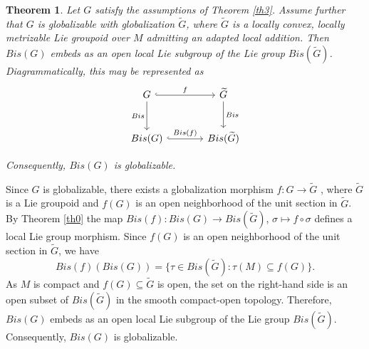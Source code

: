 \documentclass[12pt,a4paper]{amsart}
\makeatletter
\theoremstyle{plain}
\newtheorem{theorem}{Theorem}[section]
\theoremstyle{definition}
\renewenvironment{proof}[1][\proofname]{%
  \par\vspace{0.1em} %
  \pushQED{\qed}%
  \normalfont \topsep0pt \trivlist
  \item[\hskip\labelsep\itshape #1\@addpunct{.}]\ignorespaces
}{%
  \popQED\endtrivlist\@endpefalse
}
\makeatother
\begin{document}
\begin{theorem}
Let $G$ satisfy the assumptions of Theorem \ref{th3}. Assume further that $G$ is globalizable with globalization $\widetilde{G}$, where $\widetilde{G}$ is a locally convex, locally metrizable Lie groupoid over $M$ admitting an adapted local addition.
Then $Bis(G)$  embeds as an open local Lie subgroup of the Lie group $Bis(\widetilde{G})$. Diagrammatically, this  may be represented as
$$\begin{tikzcd}[column sep=large,row sep=large]
G \arrow[r, hook, "f"] \arrow[d, "Bis"']
& \widetilde{G} \arrow[d, "Bis"] \\
Bis(G) \arrow[r, hook, "Bis(f)"]
& Bis(\widetilde{G})
\end{tikzcd}$$ 

Consequently, $Bis(G)$  is globalizable.
\end{theorem}


\begin{proof}
    Since $G$ is globalizable, there exists a globalization morphism
$f:G\to \widetilde{G}$ ,
where $\widetilde{G}$  is a Lie groupoid and $f(G)$  is an open neighborhood of the unit section in $\widetilde{G}$. By Theorem \ref{th0} the map $Bis(f):Bis(G) \rightarrow Bis(\widetilde{G})$, $\sigma \mapsto  f \circ \sigma$ defines a local Lie group morphism. 
Since $f(G)$  is an open neighborhood of the unit section in $ \widetilde{G}$, we have
$$Bis(f)(Bis(G))=\{\tau\in Bis(\widetilde{G}) : \tau(M)\subseteq f(G)\}.$$
As $M$ is compact and $f(G)\subseteq \widetilde{G}$  is open, the set on the right-hand side is an open subset of $Bis(\widetilde{G})$  in the smooth compact-open topology. Therefore,
$Bis(G)$ 
embeds as an open local Lie subgroup of the Lie group
$Bis(\widetilde{G})$. Consequently, $Bis(G)$  is globalizable.
\end{proof}
\end{document}
